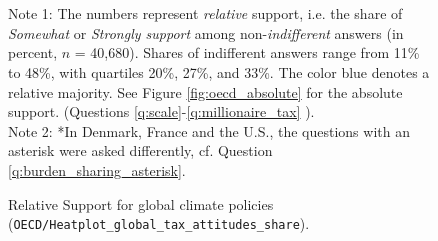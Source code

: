 \documentclass[12pt,english]{article}
\begin{document}
\begin{bibunit}
\begin{figure}[h!]
    \cprotect\caption[Relative support for global climate policies]{Relative Support for global climate policies\\ (\verb|OECD/Heatplot_global_tax_attitudes_share|).} 
    \label{fig:oecd} %
    {\footnotesize \\ $\quad$ \\ Note 1: The numbers represent \textit{relative} support, i.e. the share of \textit{Somewhat} or \textit{Strongly support} among non-\textit{indifferent} answers (in percent, $n$ = 40,680). Shares of indifferent answers range from 11\% to 48\%, with quartiles 20\%, 27\%, and 33\%. The color blue denotes a relative majority. See Figure \ref{fig:oecd_absolute} for the absolute support. (Questions \ref{q:scale}-\ref{q:millionaire_tax}%
  ). \\ Note 2: *In Denmark, France and the U.S., the questions with an asterisk were asked differently, cf. Question \ref{q:burden_sharing_asterisk}. } 
\end{figure}



\end{bibunit}
\end{document}
